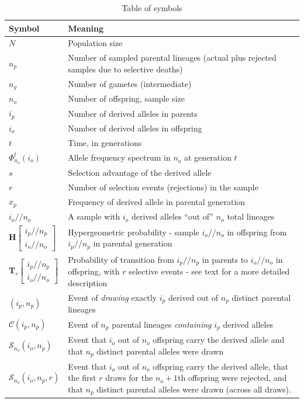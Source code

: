\documentclass[review,nonatbib]{elsarticle}
\newcommand{\dslash}{/\!\!/}
\newcommand{\Coalc}[4]{\begin{bmatrix}#1\dslash #2 \\ #3\dslash #4 \end{bmatrix}}
\newcommand{\ms}{\mathcal{S}}
\begin{document}
\begin{table}
  \centering
  \begin{tabular}{l|p{100mm}}
    Symbol & Meaning\\
    \hline
    $N$ & Population size\\
    $n_p$ & Number of sampled parental lineages (actual plus rejected samples due to selective deaths)\\
    $n_g$ & Number of gametes (intermediate)\\
    $n_o$ & Number of offspring, sample size\\
    $i_p$ & Number of derived alleles in parents\\
    $i_o$ & Number of derived alleles in offspring\\
    $t$ & Time, in generations\\
    $\Phi_{n_o}^{t}(i_o)$ & Allele frequency spectrum in $n_o$ at generation $t$\\
    $s$ & Selection advantage of the derived allele\\
    $r$ & Number of selection events (rejections) in the sample\\
    $x_p$ & Frequency of derived allele in parental generation\\
    $i_o \dslash n_o$ & A sample with $i_o$ derived alleles ``out of'' $n_o$ total lineages\\
    $\mathbf{H}\Coalc{i_p}{n_p}{i_o}{n_o}$ &
      Hypergeometric probability - sample $i_o \dslash n_o$ in offspring from
      $i_p \dslash n_p$ in parental generation\\
    $\mathbf{T}_{r}\Coalc{i_p}{n_p}{i_o}{n_o}$ &
      Probability of transition from $i_p \dslash n_p$ in parents to $i_o \dslash n_o$ in offspring, 
      with $r$ selective events - see text for a more detailed description\\
    \hline
    $(i_p, n_p)$ & Event of \textit{drawing} exactly $i_p$ derived out of $n_p$ distinct parental lineages \\
    $\mathcal{C}(i_p, n_p)$ & Event of $n_p$ parental lineages \textit{containing} $i_p$ derived alleles \\
    $\mathcal{S}_{n_o}(i_o, n_p)$ & Event that $i_o$ out of $n_o$ offspring carry the derived allele and 
      that $n_p$ distinct parental alleles were drawn \\
    $\ms_{n_o}(i_o, n_p, r)$ & Event that  $i_o$ out of $n_o$ offspring carry the derived allele, 
      that the first $r$ draws for the
    $n_o+1$th offspring were rejected,
    and that $n_p$ distinct parental alleles were drawn (across all draws).
  \end{tabular}
  \caption{\label{tab_symbols} Table of symbols}
\end{table}
\end{document}
